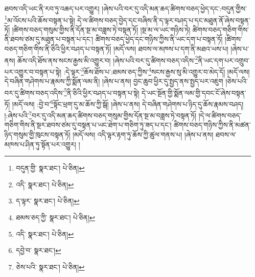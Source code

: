 ཐབས་འདི་ཡང་ནི་རབ་ཏུ་འཆད་པར་འགྱུར། །ཞེས་པའི་བར་དུ་འདི་མན་ཆད་ཚིགས་བཅད་ཕྱེད་དང་:བདུན་གྱིས་\footnote{བདུན་གྱི་  སྣར་ཐང་།  པེ་ཅིན། }མ་འོངས་པའི་ཆོས་བསྟན་པ་སྟེ། དེ་ལ་ཚིགས་བཅད་བྱེད་དང་བཞིས་ནི་ད་ལྟར་བཤད་པ་དང་མཐུན་ནོ་ཞེས་བསྟན་ཏོ། །ཚིགས་བཅད་གསུམ་གྱིས་ནི་དོན་སྔ་མ་བཟླས་ཏེ་བསྟན་ཏོ། །སྔ་མ་ལ་ཡང་གཉིས་ཏེ། ཚིགས་བཅད་གཅིག་གིས་ནི་ཐབས་ཙམ་དུ་མཐུན་པ་བསྟན་པ་དང་། ཚིགས་བཅད་ཕྱེད་དང་གཉིས་ཀྱིས་ནི་ཡང་དག་པ་བསྟན་ཏོ། །ཚིགས་བཅད་གཅིག་གིས་ནི་ཅིའི་ཕྱིར་བཤད་པ་བསྟན་ཏོ། །མདོ་ལས། ཐབས་ལ་མཁས་པ་དག་ནི་མཐའ་ཡས་པ། །ཞེས་པ་ནས། ཆོས་འདི་ཐོས་ནས་སངས་རྒྱས་མི་འགྱུར་བ། །ཞེས་པའི་བར་དུ་ཚིགས་བཅད་འདིས་\footnote{འདི་  སྣར་ཐང་།  པེ་ཅིན། }ནི་ཡང་དག་པར་འགྲུབ་པར་འགྱུར་བ་བསྟན་པ་སྟེ། :དེ་ལྟར་\footnote{ད་ལྟར་  སྣར་ཐང་།  པེ་ཅིན། }ཆོས་ཐོས་པ་:ཐམས་ཅད་ཀྱིས་\footnote{ཐམས་ཅད་ཀྱི་  སྣར་ཐང་།  པེ་ཅིན། }སངས་རྒྱས་སུ་མི་འགྱུར་བ་མེད་དོ། །མདོ་ལས། དེ་བཞིན་གཤེགས་པ་རྣམས་ཀྱི་སྨོན་ལམ་ནི། །ཞེས་པ་ནས། བྱང་ཆུབ་ཕྱིར་དུ་སྤྱད་ནས་སྤྱད་པར་འཇུག །ཅེས་པའི་བར་དུ་ཚིགས་བཅད་འདིས་\footnote{འདི་  སྣར་ཐང་།  པེ་ཅིན། }ནི་ཅིའི་ཕྱིར་བཤད་པ་བསྟན་པ་སྟེ། དེ་ཡང་སྔོན་གྱི་སྨོན་ལམ་གྱི་དབང་ངོ་ཞེས་བསྟན་ཏོ། །མདོ་ལས། :བྱེ་བ་\footnote{དབྱེ་བ་  སྣར་ཐང་། }སྟོང་ཕྲག་དུ་མ་ཆོས་ཀྱི་སྒོ། །ཞེས་པ་ནས། དེ་བཞིན་གཤེགས་པ་ཉིད་དུ་ཆོས་རྣམས་བཤད། །:ཞེས་པའི་\footnote{ཅེས་པའི་  སྣར་ཐང་།  པེ་ཅིན། }བར་དུ་འདི་མན་ཆད་ཚིགས་བཅད་གསུམ་གྱིས་དོན་སྔ་མ་བཟླས་ཏེ་བསྟན་ཏོ། །དེ་ལ་ཚིགས་བཅད་གཅིག་གིས་ནི་སྔར་ཐབས་ཙམ་དུ་བསྟན་པ་ཡང་ཐེག་པ་གཅིག་ཏུ་ཟད་པ་དང་། ཚིགས་བཅད་གཉིས་ཀྱིས་ནི་མཚན་ཉིད་གསུམ་གྱི་ཁུངས་བསྟན་ཏོ། །མདོ་ལས། འདི་ལྟར་རྟག་ཏུ་ཆོས་ཀྱི་ཚུལ་གནས་པ། །ཞེས་པ་ནས། ཐབས་ལ་མཁས་པ་ཤིན་ཏུ་སྟོན་པར་འགྱུར། །
